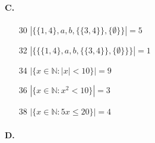 \documentclass{article}
\begin{document}
\paragraph{C.}
\begin{enumerate}
    \item [30] $|\{\{1,4\},a,b,\{\{3,4\}\},\{\emptyset\}\}| = 5$
    \item [32] $|\{\{\{1,4\},a,b,\{\{3,4\}\},\{\emptyset\}\}\}| = 1$
    \item [34] $|\{ x \in \mathbb{N}: |x|<10 \}| = 9$
    \item [36] $|\{ x \in \mathbb{N}: x^2<10 \}| = 3$
    \item [38] $|\{ x \in \mathbb{N}: 5x \le 20 \}| = 4$

\end{enumerate}
\paragraph{D.}
\end{document}

